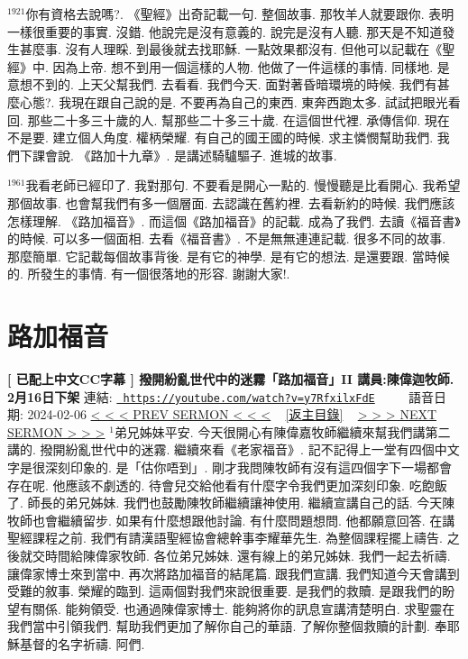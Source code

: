 \documentclass{book}
\begin{document}
$^{1921}$你有資格去說嗎?.
《聖經》出奇記載一句.
整個故事.
那牧羊人就要跟你.
表明一樣很重要的事實.
沒錯.
他說完是沒有意義的.
說完是沒有人聽.
那天是不知道發生甚麼事.
沒有人理睬.
到最後就去找耶穌.
一點效果都沒有.
但他可以記載在《聖經》中.
因為上帝.
想不到用一個這樣的人物.
他做了一件這樣的事情.
同樣地.
是意想不到的.
上天父幫我們.
去看看.
我們今天.
面對著昏暗環境的時候.
我們有甚麼心態?.
我現在跟自己說的是.
不要再為自己的東西.
東奔西跑太多.
試試把眼光看回.
那些二十多三十歲的人.
幫那些二十多三十歲.
在這個世代裡.
承傳信仰.
現在不是要.
建立個人角度.
權柄榮耀.
有自己的國王國的時候.
求主憐憫幫助我們.
我們下課會說.
《路加十九章》.
是講述騎驢驅子.
進城的故事.

$^{1961}$我看老師已經印了.
我對那句.
不要看是開心一點的.
慢慢聽是比看開心.
我希望那個故事.
也會幫我們有多一個層面.
去認識在舊約裡.
去看新約的時候.
我們應該怎樣理解.
《路加福音》.
而這個《路加福音》的記載.
成為了我們.
去讀《福音書》的時候.
可以多一個面相.
去看《福音書》.
不是無無連連記載.
很多不同的故事.
那麼簡單.
它記載每個故事背後.
是有它的神學.
是有它的想法.
是還要跟.
當時候的.
所發生的事情.
有一個很落地的形容.
謝謝大家!.
\newpage



\section{路加福音}
\label{sec:y7RfxilxFdE}
\textbf{[ 已配上中文CC字幕 ] 撥開紛亂世代中的迷霧「路加福音」II  講員:陳偉迦牧師. 2月16日下架}
\newline
\newline
連結: \href{https://youtube.com/watch?v=y7RfxilxFdE}{\texttt{ https://youtube.com/watch?v=y7RfxilxFdE}} ~~~~ 語音日期: 2024-02-06 
\newline
\newline
\hyperref[sec:KwXlOVraPWE]{\small{< < < PREV SERMON < < <}}
~
\hyperref[sec:index]{\small{[返主目錄]}}
~
\hyperref[sec:HhgTqAX1BFU]{\small{> > > NEXT SERMON > > >}}
\newline
\newline
$^{1}$弟兄姊妹平安.
今天很開心有陳偉嘉牧師繼續來幫我們講第二講的.
撥開紛亂世代中的迷霧.
繼續來看《老家福音》.
記不記得上一堂有四個中文字是很深刻印象的.
是「估你唔到」.
剛才我問陳牧師有沒有這四個字下一場都會存在呢.
他應該不劇透的.
待會兒交給他看有什麼字令我們更加深刻印象.
吃飽飯了.
師長的弟兄姊妹.
我們也鼓勵陳牧師繼續讓神使用.
繼續宣講自己的話.
今天陳牧師也會繼續留步.
如果有什麼想跟他討論.
有什麼問題想問.
他都願意回答.
在講聖經課程之前.
我們有請漢語聖經協會總幹事李耀華先生.
為整個課程擺上禱告.
之後就交時間給陳偉家牧師.
各位弟兄姊妹.
還有線上的弟兄姊妹.
我們一起去祈禱.
讓偉家博士來到當中.
再次將路加福音的結尾篇.
跟我們宣講.
我們知道今天會講到受難的敘事.
榮耀的臨到.
這兩個對我們來說很重要.
是我們的救贖.
是跟我們的盼望有關係.
能夠領受.
也通過陳偉家博士.
能夠將你的訊息宣講清楚明白.
求聖靈在我們當中引領我們.
幫助我們更加了解你自己的華語.
了解你整個救贖的計劃.
奉耶穌基督的名字祈禱.
阿們.
\end{document}
